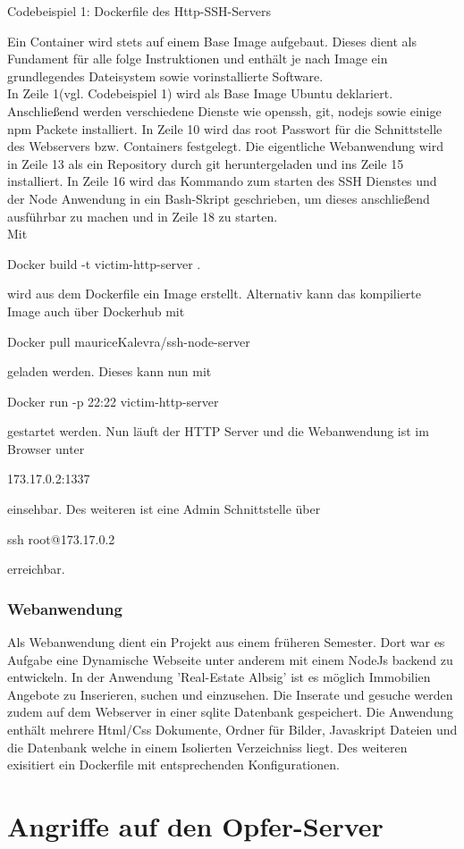 \documentclass[12pt]{article}
\begin{document}
\begin{center}
 Codebeispiel 1: Dockerfile des Http-SSH-Servers
\end{center}
Ein Container wird stets auf einem Base Image aufgebaut. Dieses dient als Fundament für alle folge Instruktionen und enthält je nach Image ein grundlegendes Dateisystem sowie vorinstallierte Software.\\
In Zeile 1(vgl. Codebeispiel 1) wird als Base Image Ubuntu deklariert. 
Anschließend werden verschiedene Dienste wie openssh, git, nodejs sowie einige npm Packete installiert.
In Zeile 10 wird das root Passwort für die Schnittstelle des Webservers bzw. Containers festgelegt. Die eigentliche Webanwendung wird in Zeile 13 als ein Repository durch git heruntergeladen und ins Zeile 15 installiert. In Zeile 16 wird das Kommando zum starten des SSH Dienstes und der Node Anwendung in ein Bash-Skript geschrieben, um dieses anschließend ausführbar zu machen und in Zeile 18 zu starten.\\
Mit \colorbox{mshadecolor}{\parbox{0.46\textwidth}{Docker build -t victim-http-server .}} wird aus dem Dockerfile ein Image erstellt. Alternativ kann das kompilierte Image auch über Dockerhub mit \colorbox{mshadecolor}{\parbox{0.58\textwidth}{Docker pull mauriceKalevra/ssh-node-server}} geladen werden. Dieses kann nun mit \colorbox{mshadecolor}{\parbox{0.51\textwidth}{Docker run -p 22:22 victim-http-server}} gestartet werden. Nun läuft der HTTP Server und die Webanwendung ist im Browser unter
\colorbox{mshadecolor}{\parbox{0.20\textwidth}{173.17.0.2:1337}} einsehbar. Des weiteren ist eine Admin Schnittstelle über \colorbox{mshadecolor}{\parbox{0.26\textwidth}{ssh root@173.17.0.2}} erreichbar.
\subsubsection{Webanwendung}
Als Webanwendung dient ein Projekt aus einem früheren Semester. Dort war es Aufgabe eine Dynamische Webseite unter anderem mit einem NodeJs backend zu entwickeln. In der Anwendung 'Real-Estate Albsig' ist es möglich Immobilien Angebote zu Inserieren, suchen und einzusehen. Die Inserate und gesuche werden zudem auf dem Webserver in einer sqlite Datenbank gespeichert. Die Anwendung enthält mehrere Html/Css Dokumente, Ordner für Bilder, Javaskript Dateien und die Datenbank welche in einem Isolierten Verzeichniss liegt. Des weiteren exisitiert ein Dockerfile mit entsprechenden Konfigurationen.          
\newpage
\section{Angriffe auf den Opfer-Server}
\end{document}
